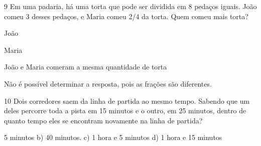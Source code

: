 
\num{9} Em uma padaria, há uma torta que pode ser dividida em 8 pedaços
iguais. João comeu 3 desses pedaços, e Maria comeu 2/4 da torta. Quem
comeu mais torta?
\item João
\item Maria
\item João e Maria comeram a mesma quantidade de torta
\item Não é possível determinar a resposta, pois as frações são diferentes.







\num{10} Dois corredores saem da linha de partida ao mesmo tempo. Sabendo que
um deles percorre toda a pista em 15 minutos e o outro, em 25 minutos,
dentro de quanto tempo eles se encontram novamente na linha de partida?
\item 5 minutos b) 40 minutos. c) 1 hora e 5 minutos d) 1 hora e 15 minutos






